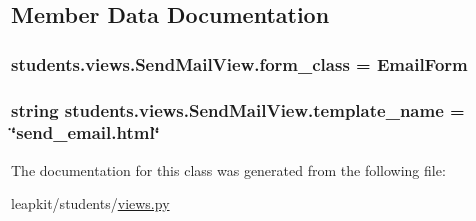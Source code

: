 \subsection{Member Data Documentation}
\hypertarget{classstudents_1_1views_1_1_send_mail_view_a66913d97023f49153b9f5aea5fa1fdc9}{
\subsubsection[{form\-\_\-class}]{\setlength{\rightskip}{0pt plus 5cm}students.\-views.\-Send\-Mail\-View.\-form\-\_\-class = Email\-Form\hspace{0.3cm}{\ttfamily [static]}}}\label{classstudents_1_1views_1_1_send_mail_view_a66913d97023f49153b9f5aea5fa1fdc9}
\hypertarget{classstudents_1_1views_1_1_send_mail_view_a4441809c3bd7f631af7c5c4ccfed95e2}{
\subsubsection[{template\-\_\-name}]{\setlength{\rightskip}{0pt plus 5cm}string students.\-views.\-Send\-Mail\-View.\-template\-\_\-name = \char`\"{}send\-\_\-email.\-html\char`\"{}\hspace{0.3cm}{\ttfamily [static]}}}\label{classstudents_1_1views_1_1_send_mail_view_a4441809c3bd7f631af7c5c4ccfed95e2}


The documentation for this class was generated from the following file\-:\begin{DoxyCompactItemize}
\item 
leapkit/students/\hyperlink{views_8py}{views.\-py}\end{DoxyCompactItemize}

